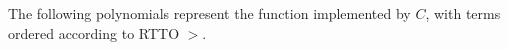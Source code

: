 \begin{Example}
The following polynomials represent the function implemented by $C$,
with terms ordered according to RTTO $>$.

\end{Example}
